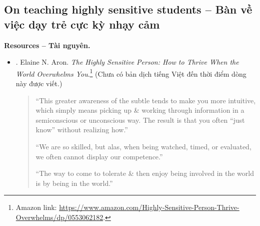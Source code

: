\documentclass[12pt]{article}
\begin{document}
\subsection{On teaching highly sensitive students -- Bàn về việc dạy trẻ cực kỳ nhạy cảm}
\textbf{\textsf{Resources -- Tài nguyên.}}
\begin{itemize}
	\item \cite{Aron_HSP}. {\sc Elaine N. Aron}. {\it The Highly Sensitive Person: How to Thrive When the World Overwhelms You}.\footnote{Amazon link: \url{https://www.amazon.com/Highly-Sensitive-Person-Thrive-Overwhelms/dp/0553062182}.} (Chưa có bản dịch tiếng Việt đến thời điểm dòng này được viết.)
	\begin{quotation}
		``This greater awareness of the subtle tends to make you more intuitive, which simply means picking up \& working through information in a semiconscious or unconscious way. The result is that you often ``just know'' without realizing how.''
		
		``We are so skilled, but alas, when being watched, timed, or evaluated, we often cannot display our competence.''
		
		``The way to come to tolerate \& then enjoy being involved in the world is by being in the world.''
	\end{quotation}
\end{itemize}


\end{document}
